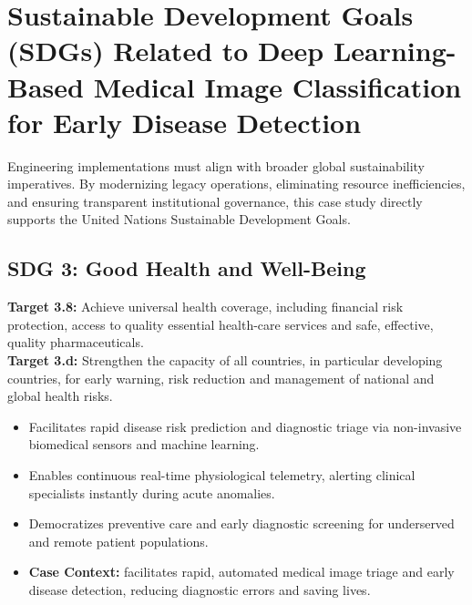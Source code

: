 \section{Sustainable Development Goals (SDGs) Related to Deep Learning-Based Medical Image Classification for Early Disease Detection}
Engineering implementations must align with broader global sustainability imperatives. By modernizing legacy operations, eliminating resource inefficiencies, and ensuring transparent institutional governance, this case study directly supports the United Nations Sustainable Development Goals.

\subsection{SDG 3: Good Health and Well-Being}
\noindent\textbf{Target 3.8:} Achieve universal health coverage, including financial risk protection, access to quality essential health-care services and safe, effective, quality pharmaceuticals. \\
\noindent\textbf{Target 3.d:} Strengthen the capacity of all countries, in particular developing countries, for early warning, risk reduction and management of national and global health risks.
\begin{itemize}
  \item Facilitates rapid disease risk prediction and diagnostic triage via non-invasive biomedical sensors and machine learning.
  \item Enables continuous real-time physiological telemetry, alerting clinical specialists instantly during acute anomalies.
  \item Democratizes preventive care and early diagnostic screening for underserved and remote patient populations.
  \item \textbf{Case Context:} facilitates rapid, automated medical image triage and early disease detection, reducing diagnostic errors and saving lives.
\end{itemize}

